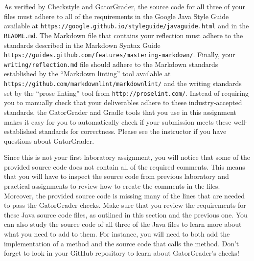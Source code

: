 \documentclass[11pt]{article}
\newcommand{\reflection}{\lstinline{writing/reflection.md}}
\newcommand{\readme}{\lstinline{README.md}}
\newcommand{\url}[1]{\lstinline{#1}}
\newcommand{\step}[1]{``{#1}''}
\begin{document}
As verified by Checkstyle and GatorGrader, the source code for all three of your
files must adhere to all of the requirements in the Google Java Style Guide
available at \url{https://google.github.io/styleguide/javaguide.html} and in the
\readme{}. The Markdown file that contains your reflection must adhere to the
standards described in the Markdown Syntax Guide
\url{https://guides.github.com/features/mastering-markdown/}. Finally, your
\reflection{} file should adhere to the Markdown standards established by the
\step{Markdown linting} tool available at
\url{https://github.com/markdownlint/markdownlint/} and the writing standards
set by the \step{prose linting} tool from \url{http://proselint.com/}. Instead
of requiring you to manually check that your deliverables adhere to these
industry-accepted standards, the GatorGrader and Gradle tools that you use in
this assignment makes it easy for you to automatically check if your submission
meets these well-established standards for correctness. Please see the
instructor if you have questions about GatorGrader.

Since this is not your first laboratory assignment, you will notice that some of
the provided source code does not contain all of the required comments. This
means that you will have to inspect the source code from previous laboratory and
practical assignments to review how to create the comments in the files.
Moreover, the provided source code is missing many of the lines that are needed
to pass the GatorGrader checks. Make sure that you review the requirements for
these Java source code files, as outlined in this section and the previous one.
You can also study the source code of all three of the Java files to learn more
about what you need to add to them. For instance, you will need to both add the
implementation of a method and the source code that calls the method. Don't
forget to look in your GitHub repository to learn about GatorGrader's checks!
\end{document}
